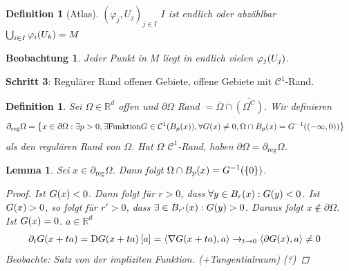 \documentclass[11pt, twoside, a4paper]{article}
\theoremstyle{plain}
\newtheorem{definition}[blockelement]{Definition}
\newtheorem{lemma}[blockelement]{Lemma}
\newtheorem{beobachtung}[blockelement]{Beobachtung}
\numberwithin{equation}{subsection}
\newcommand{\set}[1]{\left\{#1\right\}}
\newcommand{\pair}[1]{\left(#1\right)}
\newcommand{\of}[1]{\mathopen{}\mathclose{}\bgroup\left(#1\aftergroup\egroup\right)}
\newcommand{\interv}[1]{\left[#1\right]}
\newcommand{\scalprod}[1]{\left<#1\right>}
\newcommand{\Dif}{\mathop{}\!\mathrm{D}}
\newcommand{\comp}[1]{{#1}^{\mathrm{C}}}
\newcommand{\R}{\mathbb{R}}
\newcommand{\mC}{\mathcal{C}}
\begin{document}
    \begin{definition}[Atlas]
        $\pair{\varphi_j, U_j}_{j\in I}$ $I$ ist endlich oder abzählbar $\bigcup_{i\in I} \varphi_i\of{U_k} = M$
    \end{definition}

    \begin{beobachtung}
        Jeder Punkt in $M$ liegt in endlich vielen $\varphi_j\of{U_j}$.
    \end{beobachtung}

    \marginnote{[14. Feb]}
    \noindent\textbf{Schritt 3}: Regulärer Rand offener Gebiete, offene Gebiete mit $\mC^1$-Rand.

    \begin{definition}
        Sei $\Omega\in\R^d$ offen und $\partial \Omega$ Rand $= \overline{\Omega}\cap\overline{\pair{\comp{\Omega}}}$. Wir definieren
        \begin{align*}
            \partial_{\text{reg}}\Omega &= \set{x\in\partial\Omega: \exists p > 0, \exists\text{Funktion} G\in\mC^{1}\of{B_p\of{x}}, \forall G\of{x}\neq 0, \Omega\cap B_p\of{x} = G^{-1}\of{\pair{-\infty, 0}}}
        \end{align*}
        als den regulären Rand von $\Omega$. Hat $\Omega$ $\mC^1$-Rand, haben $\partial\Omega = \partial_{\text{reg}}\Omega$.
    \end{definition}

    \begin{lemma}
        Sei $x\in\partial_{\text{reg}}\Omega$. Dann folgt $\Omega \cap B_p\of{x} = G^{-1}\of{\set{0}}$.

        \begin{proof}
            Ist $G\of{x} < 0$. Dann folgt für $r> 0$, dass $\forall y\in B_{r}\of{x}: G\of{y} < 0$. Ist $G\of{x} > 0$, so folgt für $r' > 0$, dass $\exists\in B_{r'}\of{x}: G\of{y} > 0$. Daraus folgt $x\not\in\partial\Omega$.\\
            Ist $G\of{x} = 0$. $a\in\R^d$
            \begin{align*}
                \partial_t G\of{x+ ta} &= \Dif G\of{x+ta}\interv{a} = \scalprod{\nabla G\of{x+ta}, a} \to_{t\to 0} \scalprod{\partial G\of{x}, a} \neq 0
            \end{align*}
            Beobachte: Satz von der impliziten Funktion. (+Tangentialraum) (?)\qedhere
        \end{proof}
    \end{lemma}
\end{document}
